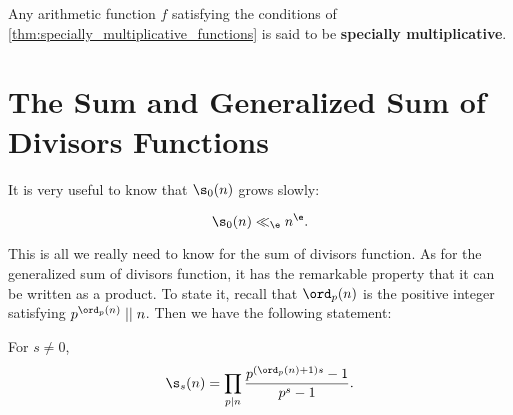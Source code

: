     Any arithmetic function $f$ satisfying the conditions of \cref{thm:specially_multiplicative_functions} is said to be \textbf{specially multiplicative}.
  \section{The Sum and Generalized Sum of Divisors Functions}
    It is very useful to know that $\s_{0}(n)$ grows slowly:

    \begin{proposition}\label{prop:sum_of_divisors_growth_rate}
      \phantom{ }
      \[
        \s_{0}(n) \ll_{\e} n^{\e}.
      \]
    \end{proposition} 

    This is all we really need to know for the sum of divisors function. As for the generalized sum of divisors function, it has the remarkable property that it can be written as a product. To state it, recall that $\ord_{p}(n)$ is the positive integer satisfying $p^{\ord_{p}(n)} \mid\mid n$. Then we have the following statement:

    \begin{proposition}\label{prop:generalized_sum_of_divisors_as_product}
      For $s \neq 0$,
      \[
        \s_{s}(n) = \prod_{p \mid n}\frac{p^{(\ord_{p}(n)+1)s}-1}{p^{s}-1}.
      \]
    \end{proposition}
